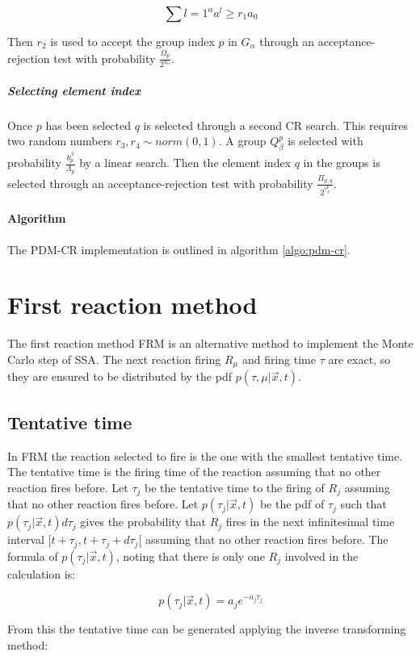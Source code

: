       $$\sum l = 1^\alpha a^l\ge r_1a_0$$

      Then $r_2$ is used to accept the group index $p$ in $G_\alpha$ through an acceptance-rejection test with probability $\frac{\Omega_p}{2^{u_\alpha}}$.

      \subparagraph{Selecting element index}
      Once $p$ has been selected $q$ is selected through a second CR search.
      This requires two random numbers $r_3,r_4\sim norm(0,1)$.
      A group $Q_\beta^p$ is selected with probability $\frac{b_p^\beta}{\Lambda_p}$ by a linear search.
      Then the element index $q$ in the groups is selected through an acceptance-rejection test with probability $\frac{\Pi_{p,q}}{2^{v_\beta^p}}$.

    \paragraph{Algorithm}
    The PDM-CR implementation is outlined in algorithm \ref{algo:pdm-cr}.

    

\section{First reaction method}
The first reaction method FRM is an alternative method to implement the Monte Carlo step of SSA.
The next reaction firing $R_\mu$ and firing time $\tau$ are exact, so they are ensured to be distributed by the pdf $p(\tau, \mu|\vec{x},t)$.

  \subsection{Tentative time}
  In FRM the reaction selected to fire is the one with the smallest tentative time.
  The tentative time is the firing time of the reaction assuming that no other reaction fires before.
  Let $\tau_j$ be the tentative time to the firing of $R_j$ assuming that no other reaction fires before.
  Let $p(\tau_j|\vec{x}, t)$ be the pdf of $\tau_j$ such that $p(\tau_j|\vec{x},t)d\tau_j$ gives the probability that $R_j$ fires in the next infinitesimal time interval $[t+\tau_j, t+\tau_j+d\tau_j[$ assuming that no other reaction fires before.
  The formula of $p(\tau_j|\vec{x},t)$, noting that there is only one $R_j$ involved in the calculation is:

  $$p(\tau_j|\vec{x},t) = a_je^{-a_j\tau_j}$$

  From this the tentative time can be generated applying the inverse transforming method:

